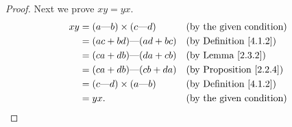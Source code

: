 \begin{proof}
    Next we prove \(xy = yx\).
    \begin{align*}
        xy & = (a \text{---} b) \times (c \text{---} d) &  & \text{(by the given condition)}     \\
           & = (ac + bd) \text{---} (ad + bc)           &  & \text{(by Definition \ref{4.1.2})}  \\
           & = (ca + db) \text{---} (da + cb)           &  & \text{(by Lemma \ref{2.3.2})}       \\
           & = (ca + db) \text{---} (cb + da)           &  & \text{(by Proposition \ref{2.2.4})} \\
           & = (c \text{---} d) \times (a \text{---} b) &  & \text{(by Definition \ref{4.1.2})}  \\
           & = yx.                                      &  & \text{(by the given condition)}
    \end{align*}


\end{proof}
